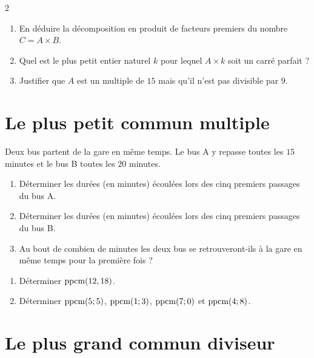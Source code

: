 \documentclass[10pt, a4paper]{article}
\begin{document}
\begin{multicols*}{2}
\begin{Application}[][20 min]
\begin{enumerate}[leftmargin=*,itemsep=0.5pt]
    \item En déduire la décomposition en produit de facteurs premiers du nombre $C = A \times B$.

    \item Quel est le plus petit entier naturel $k$ pour lequel $A \times k$ soit un carré parfait ?

    \item Justifier que $A$ est un multiple de $15$ mais qu'il n'est pas divisible par $9$.
\end{enumerate}
\end{Application}


\section{Le plus petit commun multiple}

\begin{Activite}[][10 min]
Deux bus partent de la gare en même temps.
Le bus A y repasse toutes les $15$ minutes et le bus B toutes les $20$ minutes.

\begin{enumerate}[leftmargin=*,itemsep=0.5pt]
    \item Déterminer les durées (en minutes) écoulées lors des cinq premiers passages du bus A.
    \item Déterminer les durées (en minutes) écoulées lors des cinq premiers passages du bus B.
    \item Au bout de combien de minutes les deux bus se retrouveront-ils à la gare en même temps pour la première fois ?
\end{enumerate}
\end{Activite}

\begin{Application}[][10 min]
\begin{enumerate}[leftmargin=*,itemsep=0.5pt]
    \item Déterminer $\operatorname{ppcm}(12, 18)$.

    \item Déterminer $\operatorname{ppcm}(5;5)$, $\operatorname{ppcm}(1;3)$, $\operatorname{ppcm}(7;0)$ et $\operatorname{ppcm}(4;8)$.
\end{enumerate}
\end{Application}


\section{Le plus grand commun diviseur}


\end{multicols*}
\end{document}

